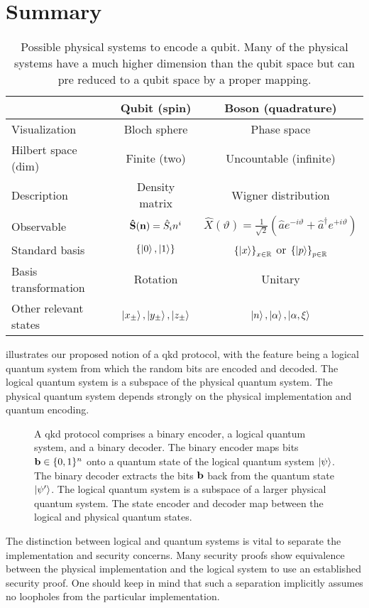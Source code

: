 \section*{Summary}

\begin{table}[htb]
	\centering	
	\begin{tabular}{lcc}
		\toprule
			& Qubit (spin) & Boson (quadrature) \\
		\midrule
			Visualization & Bloch sphere & Phase space \\
			Hilbert space (dim) & Finite (two) & Uncountable (infinite) \\
			Description & Density matrix & Wigner distribution \\
			Observable & $\vb{\hat{S}}(\vb{n})=\hat{S}_in^i$ & $\hat{X}(\vartheta)=\frac{1}{\sqrt{2}}\left(\hat{a}e^{-i\vartheta}+\hat{a}^\dagger e^{+i\vartheta}\right)$ \\
			Standard basis & $\left\{\ket{0},\ket{1}\right\}$ & $\left\{\ket{x}\right\}_{x\in\mathbb{R}}$ or $\left\{\ket{p}\right\}_{p\in\mathbb{R}}$ \\
			Basis transformation & Rotation & Unitary \\
			Other relevant states & $\ket{x_\pm},\ket{y_\pm},\ket{z_\pm}$ & $\ket{n},\ket{\alpha},\ket{\alpha,\xi}$ \\
		\bottomrule
	\end{tabular}
	\caption{Possible physical systems to encode a qubit. Many of the physical systems have a much higher dimension than the qubit space but can pre reduced to a qubit space by a proper mapping.}
\end{table}

 illustrates our proposed notion of a \gls{qkd} protocol, with the feature being a logical quantum system from which the random bits are encoded and decoded.
The logical quantum system is a subspace of the physical quantum system.
The physical quantum system depends strongly on the physical implementation and quantum encoding.
\begin{figure}[htb]
	\centering
	
	\caption{A \gls{qkd} protocol comprises a binary encoder, a logical quantum system, and a binary decoder. The binary encoder maps bits $\vb{b}\in\{0,1\}^n$ onto a quantum state of the logical quantum system $\ket{\psi}$. The binary decoder extracts the bits $\vb{b}$ back from the quantum state $\ket{\psi^\prime}$. The logical quantum system is a subspace of a larger physical quantum system. The state encoder and decoder map between the logical and physical quantum states.}\label{fig:qkd_protocol}
\end{figure}
The distinction between logical and quantum systems is vital to separate the implementation and security concerns.
Many security proofs show equivalence between the physical implementation and the logical system to use an established security proof.
One should keep in mind that such a separation implicitly assumes no loopholes from the particular implementation.